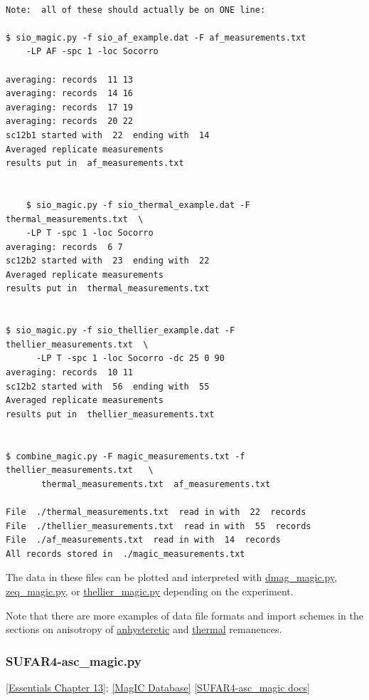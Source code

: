 \documentclass[11pt]{book}
\begin{document}
{{\begin{verbatim}

Note:  all of these should actually be on ONE line:

$ sio_magic.py -f sio_af_example.dat -F af_measurements.txt
    -LP AF -spc 1 -loc Socorro

averaging: records  11 13
averaging: records  14 16
averaging: records  17 19
averaging: records  20 22
sc12b1 started with  22  ending with  14
Averaged replicate measurements
results put in  af_measurements.txt


    $ sio_magic.py -f sio_thermal_example.dat -F thermal_measurements.txt  \
    -LP T -spc 1 -loc Socorro
averaging: records  6 7
sc12b2 started with  23  ending with  22
Averaged replicate measurements
results put in  thermal_measurements.txt


$ sio_magic.py -f sio_thellier_example.dat -F  thellier_measurements.txt  \
      -LP T -spc 1 -loc Socorro -dc 25 0 90
averaging: records  10 11
sc12b2 started with  56  ending with  55
Averaged replicate measurements
results put in  thellier_measurements.txt


$ combine_magic.py -F magic_measurements.txt -f  thellier_measurements.txt   \
       thermal_measurements.txt  af_measurements.txt

File  ./thermal_measurements.txt  read in with  22  records
File  ./thellier_measurements.txt  read in with  55  records
File  ./af_measurements.txt  read in with  14  records
All records stored in  ./magic_measurements.txt

 \end{verbatim}

The data in these files can be plotted and interpreted with \href{#dmag_magic.py}{dmag\_magic.py}, \href{#zeq_magic.py}{zeq\_magic.py}, or \href{#thellier_magic.py}{ thellier\_magic.py}  depending on the experiment.

Note that there are more examples of data file formats and import schemes in the sections on anisotropy of \href{#aarm_magic.py}{anhysteretic}  and \href{#atrm_magic.py}{thermal} remanences.


\subsubsection{SUFAR4-asc\_magic.py}
\href{http://earthref.org/MAGIC/books/Tauxe/Essentials/WebBook3ch13.html#ch13}{[Essentials Chapter 13]};
\href{#MagICDatabase}{[MagIC Database]}
\href{https://github.com/PmagPy/PmagPy/blob/master/programs/SUFAR4-asc_magic.py}{[SUFAR4-asc\_magic docs]}


}}
\end{document}
